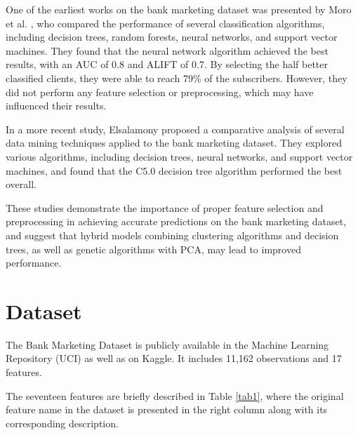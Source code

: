 \documentclass[conference]{IEEEtran}
\begin{document}
One of the earliest works on the bank marketing dataset was presented by Moro et al. \cite{moro2014data}, who compared the performance of several classification algorithms, including decision trees, random forests, neural networks, and support vector machines. They found that the neural network algorithm achieved the best results, with an AUC of 0.8 and ALIFT of 0.7. By selecting the half better classified clients, they were able to reach 79\% of the subscribers. However, they did not perform any feature selection or preprocessing, which may have influenced their results.

In a more recent study, Elsalamony \cite{elsalamony2019bank} proposed a comparative analysis of several data mining techniques applied to the bank marketing dataset. They explored various algorithms, including decision trees, neural networks, and support vector machines, and found that the C5.0 decision tree algorithm performed the best overall.

These studies demonstrate the importance of proper feature selection and preprocessing in achieving accurate predictions on the bank marketing dataset, and suggest that hybrid models combining clustering algorithms and decision trees, as well as genetic algorithms with PCA, may lead to improved performance.

\section{Dataset}
The Bank Marketing Dataset is publicly available in the Machine Learning Repository (UCI) as well as on Kaggle. It includes 11,162 observations and 17 features.

The seventeen features are briefly described in Table \ref{tab1}, where the original feature name in the dataset is presented in the right column along with its corresponding description.
\end{document}
